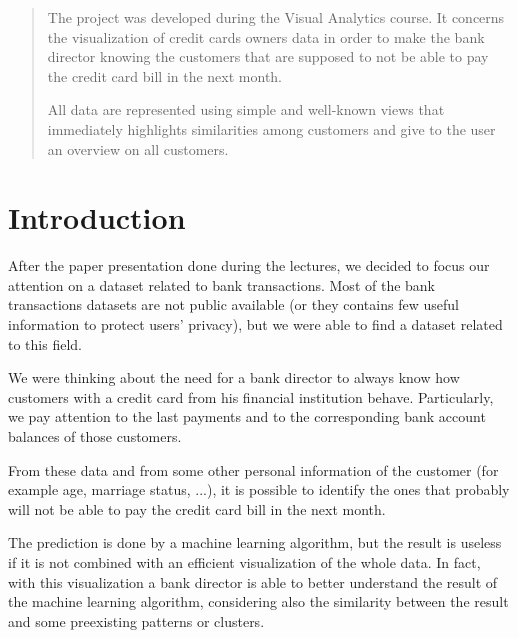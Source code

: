 \documentclass{vldb}
\begin{document}


\maketitle

\begin{abstract}
The project was developed during the Visual Analytics course. It concerns the visualization of credit cards owners data in order to
make the bank director knowing the customers that are supposed to not be able to pay the credit card bill in the next month.

All data are represented using simple and well-known views that immediately highlights similarities among customers and give to the user an
overview on all customers.
\end{abstract}




\section{Introduction}
After the paper presentation done during the lectures, we decided to focus our attention on a dataset related to bank transactions.
Most of the bank transactions datasets are not public available (or they contains few useful information to protect users' privacy), but we were able to find
a dataset related to this field.

We were thinking about the need for a bank director to always know how customers with a credit card from his financial institution behave. Particularly, we pay attention
to the last payments and to the corresponding bank account balances of those customers.

From these data and from some other personal information of the customer (for example age, marriage status, ...), it is possible to identify the ones that probably will not be able
to pay the credit card bill in the next month.

The prediction is done by a machine learning algorithm, but the result is useless if it is not combined with an efficient visualization of the whole data. In fact, with this visualization
a bank director is able to better understand the result of the machine learning algorithm, considering also the similarity between the result and some preexisting patterns or clusters.
\end{document}
